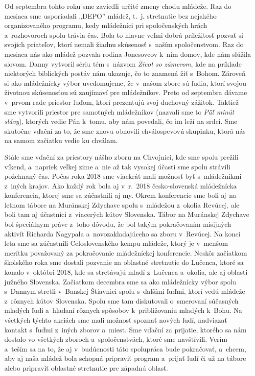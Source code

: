Od septembra tohto roku sme zaviedli určité zmeny chodu mládeže. Raz do mesiaca sme usporiadali „DEPO” mládež, t.~j. stretnutie bez nejakého organizovaného programu, kedy mládežníci pri spoločenských hrách a~rozhovoroch spolu trávia čas. Bola to hlavne veľmi dobrá príležitosť pozvať si svojich priateľov, ktorí nemali žiadnu skúsenosť s~naším spoločenstvom. Raz do mesiaca nás ako mládež pozvala rodina Jonesovcov k~nim domov, kde nám slúžila slovom. Danny vytvoril sériu tém s~názvom {\it Život so zámerom}, kde na príklade niektorých biblických postáv nám ukazuje, čo to znamená žiť s~Bohom. Zároveň si ako mládežnícky výbor uvedomujeme, že v~našom zbore sú ľudia, ktorí svojou životnou skúsenosťou sú zaujímaví pre mládežníkov. Preto od septembra dávame v~prvom rade priestor ľuďom, ktorí prezentujú svoj duchovný zážitok. Taktiež sme vytvorili priestor pre samotných mládežníkov (nazvali sme to {\it Päť minút slávy}), ktorých vedie Pán k~tomu, aby nám povedali, čo im leží na srdci. Sme skutočne vďační za to, že sme znovu obnovili chválospevovú skupinku, ktorá nás na samom začiatku vedie ku chválam.

Stále sme vďační za priestory nášho zboru na Chvojnici, kde sme spolu prežili víkend, a~napriek veľkej zime a~nie až tak vysokej účasti sme spolu strávili požehnaný čas. Počas roka 2018 sme viackrát mali možnosť byť s~mládežníkmi z~iných krajov. Ako každý rok bola aj v~r.~2018 česko-slovenská mládežnícka konferencia, ktorej sme sa zúčastnili aj my. Okrem konferencie sme boli aj na letnom tábore na Muránskej Zdychave spolu s~mládežou z~okolia Revúcej, ale boli tam aj účastníci z~viacerých kútov Slovenska. Tábor na Muránskej Zdychave bol špeciálnym práve z~toho dôvodu, že bol takým pokračovaním misijných aktivít Richarda Nagypala a~novozakladajúceho sa zboru v~Revúcej. Na konci leta sme sa zúčastnili Celoslovenského kempu mládeže, ktorý je v~menšom merítku považovaný za pokračovanie mládežníckej konferencie. Neskôr začiatkom školského roka sme dostali pozvanie na oblastné stretnutie do Lučenca, ktoré sa konalo v~októbri 2018, kde sa stretávajú mladí z~Lučenca a~okolia, ale aj oblasti južného Slovenska. Začiatkom decembra sme sa ako mládežnícky výbor spolu s~Dannym stretli v~Banskej Štiavnici spolu s~ďalšími ľuďmi, ktorí vedú mládeže z~rôznych kútov Slovenska. Spolu sme tam diskutovali o~smerovaní súčasných mladých ľudí a~hľadaní rôznych spôsobov k~približovaniu mladých k~Bohu. Na všetkých týchto akciách sme mali možnosť spoznať nových ľudí, nadviazať kontakt s~ľuďmi z~iných zborov a~miest. Sme vďační za prijatie, ktorého sa nám dostalo vo všetkých zboroch a~spoločenstvách, ktoré sme navštívili. Verím a~teším sa na to, že aj v~budúcnosti táto spolupráca bude pokračovať, a~chcem, aby aj naša mládež bola schopná pripraviť program a~prijať ľudí či už na tábore alebo pripraviť oblastné stretnutie pre západnú oblasť.

